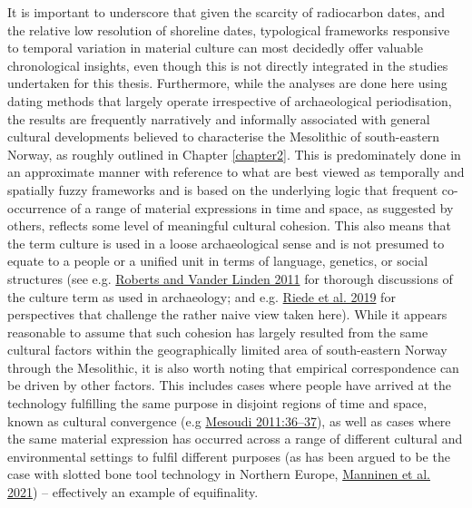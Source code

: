 \documentclass[
  12pt,
  a4paper,
  oneside]{book}
\begin{document}
It is important to underscore that given the scarcity of radiocarbon dates, and the relative low resolution of shoreline dates, typological frameworks responsive to temporal variation in material culture can most decidedly offer valuable chronological insights, even though this is not directly integrated in the studies undertaken for this thesis. Furthermore, while the analyses are done here using dating methods that largely operate irrespective of archaeological periodisation, the results are frequently narratively and informally associated with general cultural developments believed to characterise the Mesolithic of south-eastern Norway, as roughly outlined in Chapter \ref{chapter2}. This is predominately done in an approximate manner with reference to what are best viewed as temporally and spatially fuzzy frameworks and is based on the underlying logic that frequent co-occurrence of a range of material expressions in time and space, as suggested by others, reflects some level of meaningful cultural cohesion. This also means that the term culture is used in a loose archaeological sense and is not presumed to equate to a people or a unified unit in terms of language, genetics, or social structures (see e.g. \protect\hyperlink{ref-roberts2011}{Roberts and Vander Linden 2011} for thorough discussions of the culture term as used in archaeology; and e.g. \protect\hyperlink{ref-riede2019}{Riede et al. 2019} for perspectives that challenge the rather naive view taken here). While it appears reasonable to assume that such cohesion has largely resulted from the same cultural factors within the geographically limited area of south-eastern Norway through the Mesolithic, it is also worth noting that empirical correspondence can be driven by other factors. This includes cases where people have arrived at the technology fulfilling the same purpose in disjoint regions of time and space, known as cultural convergence (e.g \protect\hyperlink{ref-mesoudi2011}{Mesoudi 2011:36--37}), as well as cases where the same material expression has occurred across a range of different cultural and environmental settings to fulfil different purposes (as has been argued to be the case with slotted bone tool technology in Northern Europe, \protect\hyperlink{ref-manninen2021}{Manninen et al. 2021}) -- effectively an example of equifinality.
\end{document}
